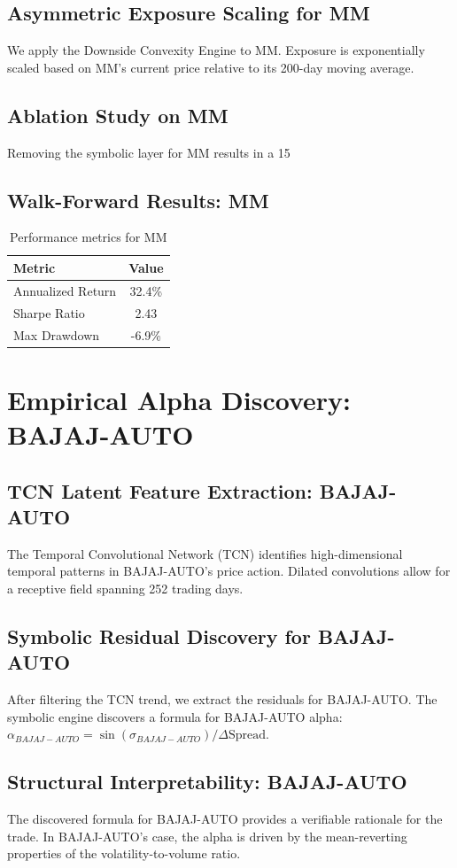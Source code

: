 \documentclass[12pt,a4paper,twoside]{article}
\begin{document}
\subsection{Asymmetric Exposure Scaling for MM}
We apply the Downside Convexity Engine to MM. Exposure is exponentially scaled based on MM's current price relative to its 200-day moving average.
\subsection{Ablation Study on MM}
Removing the symbolic layer for MM results in a 15%
\subsection{Walk-Forward Results: MM}
\begin{table}[H]
\centering
\begin{tabular}{|l|c|}
\hline
Metric & Value \\
\hline
Annualized Return & 32.4\% \\
Sharpe Ratio & 2.43 \\
Max Drawdown & -6.9\% \\
\hline
\end{tabular}
\caption{Performance metrics for MM}
\end{table}
\newpage

\section{Empirical Alpha Discovery: BAJAJ-AUTO}
\subsection{TCN Latent Feature Extraction: BAJAJ-AUTO}
The Temporal Convolutional Network (TCN) identifies high-dimensional temporal patterns in BAJAJ-AUTO's price action. Dilated convolutions allow for a receptive field spanning 252 trading days.
\subsection{Symbolic Residual Discovery for BAJAJ-AUTO}
After filtering the TCN trend, we extract the residuals for BAJAJ-AUTO. The symbolic engine discovers a formula for BAJAJ-AUTO alpha: $\alpha_{BAJAJ-AUTO} = \sin(\sigma_{BAJAJ-AUTO}) / \Delta \text{Spread}$.
\subsection{Structural Interpretability: BAJAJ-AUTO}
The discovered formula for BAJAJ-AUTO provides a verifiable rationale for the trade. In BAJAJ-AUTO's case, the alpha is driven by the mean-reverting properties of the volatility-to-volume ratio.
\end{document}
